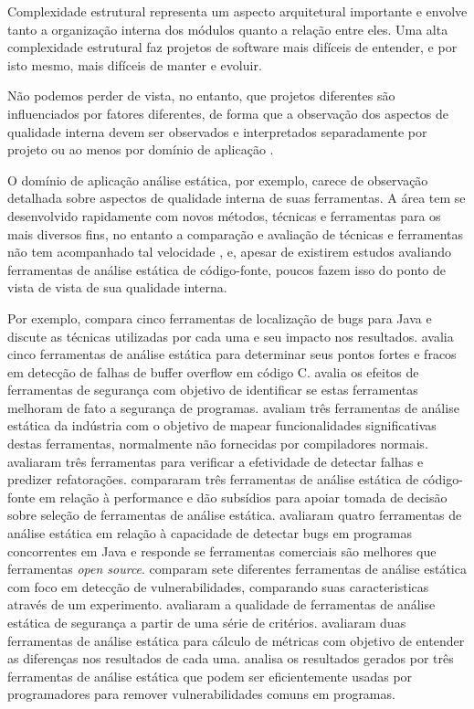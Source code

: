 Complexidade estrutural representa um aspecto arquitetural importante e envolve
tanto a organização interna dos módulos quanto a relação entre eles. Uma alta
complexidade estrutural faz projetos de software mais difíceis de entender, e
por isto mesmo, mais difíceis de manter e evoluir.

Não podemos perder de vista, no entanto, que projetos diferentes são
influenciados por fatores diferentes, de forma que a observação dos aspectos
de qualidade interna devem ser observados e interpretados separadamente por
projeto \cite{Terceiro2012Understanding} ou ao menos por domínio de
aplicação \cite{Meirelles2013}.

O domínio de aplicação análise estática, por exemplo, carece de observação
detalhada sobre aspectos de qualidade interna de suas ferramentas. A
área tem se desenvolvido rapidamente com novos métodos, técnicas e ferramentas
para os mais diversos fins, no entanto a comparação e avaliação de técnicas e ferramentas
não tem acompanhado tal velocidade \cite{Li2010}, e, apesar de existirem
estudos avaliando ferramentas de análise estática de código-fonte, poucos
fazem isso do ponto de vista de vista de sua qualidade interna.

Por exemplo,  compara cinco ferramentas de localização
de bugs para Java e discute as técnicas utilizadas por cada uma e seu impacto
nos resultados.  avalia cinco ferramentas de
análise estática para determinar seus pontos fortes e fracos em detecção de
falhas de buffer overflow em código C.  avalia os efeitos
de ferramentas de segurança com objetivo de identificar se estas ferramentas
melhoram de fato a segurança de programas. 
avaliam três ferramentas de análise estática da indústria com o objetivo de
mapear funcionalidades significativas destas ferramentas, normalmente não
fornecidas por compiladores normais.  avaliaram três
ferramentas para verificar a efetividade de detectar falhas e predizer
refatorações.  compararam três ferramentas de análise
estática de código-fonte em relação à performance e dão subsídios para apoiar
tomada de decisão sobre seleção de ferramentas de análise estática.
 avaliaram quatro ferramentas de análise estática em
relação à capacidade de detectar bugs em programas concorrentes em Java e
responde se ferramentas comerciais são melhores que ferramentas {\it open
source}.  comparam sete diferentes ferramentas de análise
estática com foco em detecção de vulnerabilidades, comparando suas
caracteristicas através de um experimento.  avaliaram a
qualidade de ferramentas de análise estática de segurança a partir de uma
série de critérios.  avaliaram duas ferramentas de
análise estática para cálculo de métricas com objetivo de entender as
diferenças nos resultados de cada uma.  analisa os
resultados gerados por três ferramentas de análise estática que podem ser
eficientemente usadas por programadores para remover vulnerabilidades comuns
em programas.

